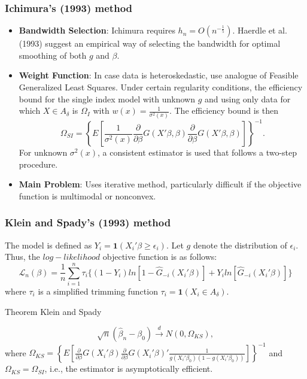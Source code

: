 \documentclass{beamer}
\begin{document}
\begin{frame}
\frametitle{Ichimura's (1993) method}
\begin{itemize}
		\item \textbf{Bandwidth Selection}:
Ichimura requires $h_n=O(n^{-\frac{1}{5}})$. Haerdle et al.(1993) suggest an empirical way of selecting the bandwidth for optimal smoothing of both $g$ and $\beta$.
		\item \textbf{Weight Function}:
	In case data is heteroskedastic, use analogue of Feasible Generalized Least Squares. Under certain regularity conditions, the efficiency bound for the single index model with unknown $g$ and using only data for which $X \in A_{\delta}$ is $\Omega_I$ with $w(x) = \frac{1}{\sigma^2(x)}$. The efficiency bound is then
		\begin{equation}
\Omega_{SI} = \left\{ E\left[\frac{1}{\sigma^2(x)}\frac{\partial}{\partial \beta}
 G(X'\beta,\beta)\frac{\partial}{\partial \beta} G(X'\beta,\beta) \right] \right\}^{-1}.
		\end{equation}
For unknown $\sigma^2(x)$, a consistent estimator is used that follows a two-step procedure.
		\item \textbf{Main Problem}: Uses iterative method, particularly difficult if the objective function is multimodal or nonconvex.
\end{itemize}
\end{frame}






\begin{frame}
\frametitle{Klein and Spady's (1993) method}

The model is defined as $Y_i =  \mathbf{1}{(X_i'\beta \geq \epsilon_i)}$. Let $g$ denote the distribution of $\epsilon_i$.
Thus, the $log-likelihood$ objective function is as follows:
\begin{equation}
\mathcal{L}_n(\beta) = \frac{1}{n}\sum_{i=1}^n \tau_{i}\{ (1 - Y_i)ln[ 1 - \hat{G}_{-i}(X_i'\beta)] +  Y_iln[\hat{G}_{-i}(X_i'\beta)]\}
\end{equation}
where $\tau_i$ is a simplified trimming function $\tau_i = \mathbf{1}{(X_i \in A_\delta)}$.
\begin{block}{Theorem Klein and Spady}
{\footnotesize \[\sqrt{n}(\hat{\beta}_{n} - \beta_0) \stackrel{d}{\rightarrow} N(0,\Omega_{KS}),
\] where $ \Omega_{KS} = \left\{ E\left[\frac{\partial}{\partial \beta}
 G(X_i'\beta)\frac{\partial}{\partial \beta} G(X_i'\beta)'\frac{1}{g(X_i'\beta_0)(1 - g(X_i'\beta_0))} \right]\right\}^{-1} $
 and $\Omega_{KS} = \Omega_{SI}$, i.e., the estimator is asymptotically efficient.\par}
\end{block}

\end{frame}
\end{document}
